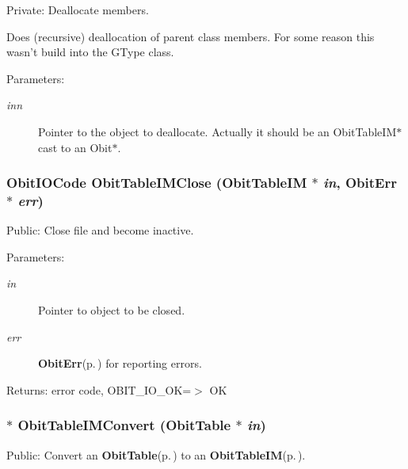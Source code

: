 Private: Deallocate members. 

Does (recursive) deallocation of parent class members. For some reason this wasn't build into the GType class. \begin{Desc}
\item[Parameters:]
\begin{description}
\item[{\em inn}]Pointer to the object to deallocate. Actually it should be an Obit\-Table\-IM$\ast$ cast to an Obit$\ast$. \end{description}
\end{Desc}
\subsubsection{\setlength{\rightskip}{0pt plus 5cm}Obit\-IOCode Obit\-Table\-IMClose ({\bf Obit\-Table\-IM} $\ast$ {\em in}, {\bf Obit\-Err} $\ast$ {\em err})}\label{ObitTableIM_8c_a25}


Public: Close file and become inactive. 

\begin{Desc}
\item[Parameters:]
\begin{description}
\item[{\em in}]Pointer to object to be closed. \item[{\em err}]{\bf Obit\-Err}{\rm (p.\,\pageref{structObitErr})} for reporting errors. \end{description}
\end{Desc}
\begin{Desc}
\item[Returns:]error code, OBIT\_\-IO\_\-OK=$>$ OK \end{Desc}
\subsubsection{$\ast$ Obit\-Table\-IMConvert ({\bf Obit\-Table} $\ast$ {\em in})}\label{ObitTableIM_8c_a19}


Public: Convert an {\bf Obit\-Table}{\rm (p.\,\pageref{structObitTable})} to an {\bf Obit\-Table\-IM}{\rm (p.\,\pageref{structObitTableIM})}. 

